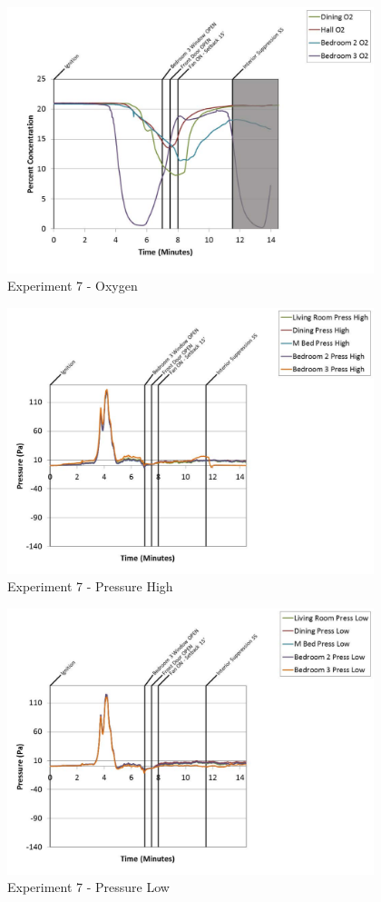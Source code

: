 \documentclass{article}
\begin{document}
\begin{appendices}
	\begin{figure}[h!]
		\centering
		\includegraphics[height=3.05in]{0_Images/Results_Charts/Exp_7_Charts/Oxygen.pdf}
		\caption{Experiment 7 - Oxygen}
	\end{figure}
 
	\clearpage

	\begin{figure}[h!]
		\centering
		\includegraphics[height=3.05in]{0_Images/Results_Charts/Exp_7_Charts/PressureHigh.pdf}
		\caption{Experiment 7 - Pressure High}
	\end{figure}
 

	\begin{figure}[h!]
		\centering
		\includegraphics[height=3.05in]{0_Images/Results_Charts/Exp_7_Charts/PressureLow.pdf}
		\caption{Experiment 7 - Pressure Low}
	\end{figure}
 

\end{appendices}
\end{document}
